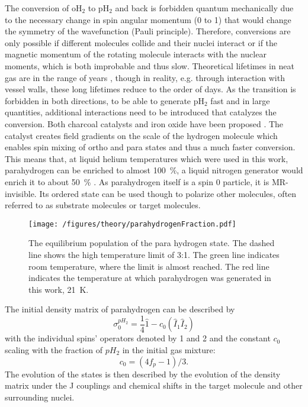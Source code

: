             The conversion of oH$_2$ to pH$_2$ and back is forbidden quantum mechanically due to the necessary change in spin angular momentum (0 to 1) that would change the symmetry of the wavefunction (Pauli principle)\cite{minaev_spin_1995}. Therefore, conversions are only possible if different molecules collide and their nuclei interact or if the magnetic momentum of the rotating molecule interacts with the nuclear moments, which is both improbable and thus slow. Theoretical lifetimes in neat gas are in the range of years \cite{green_theory_2012-1}, though in reality, e.g. through interaction with vessel walls, these long lifetimes reduce to the order of days. As the transition is forbidden in both directions, to be able to generate pH$_2$ fast and in large quantities, additional interactions need to be introduced that catalyzes the conversion. Both charcoal catalysts and iron oxide have been proposed \cite{dechent_proton_nodate}. The catalyst creates field gradients on the scale of the hydrogen molecule which enables spin mixing of ortho and para states\cite{minaev_spin_1995} and thus a much faster conversion. This means that, at liquid helium temperatures which were used in this work, parahydrogen can be enriched to almost \SI{100}{\%}, a liquid nitrogen generator would enrich it to about \SI{50}{\%} \cite{zhuzhgov_low-temperature_2018}.
            As parahydrogen itself is a spin 0 particle, it is MR-invisible. Its ordered state can be used though to polarize other molecules, often referred to as substrate molecules or target molecules.
            \begin{figure}
                \centering
                \texttt{[image: /figures/theory/parahydrogenFraction.pdf]}
                \caption[Parahydrogen fraction]{The equilibrium population of the para hydrogen state. The dashed line shows the high temperature limit of 3:1. The green line indicates room temperature, where the limit is almost reached. The red line indicates the temperature at which parahydrogen was generated in this work, \SI{21}{\kelvin}.}
                \label{figure:theory:ph2Fraction}
            \end{figure}
            The initial density matrix of parahydrogen can be described by
            \begin{equation}
                \sigma_0^{pH_2} = \frac{1}{4} \hat 1 - c_0(\hat{I}_1\hat{I}_2)
            \end{equation}
            with the individual spins' operators denoted by 1 and 2 \cite{green_theory_2012-1} and the constant $c_0$ scaling with the fraction of $pH_2$ in the initial gas mixture:
            \begin{equation*}
                c_0=(4f_p-1)/3.
            \end{equation*}
            The evolution of the states is then described by the evolution of the density matrix under the J couplings and chemical shifts in the target molecule and other surrounding nuclei. 
